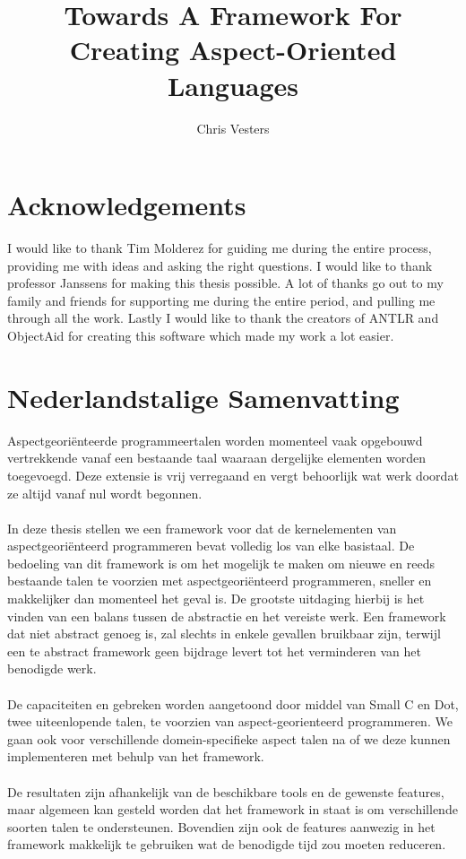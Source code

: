 \documentclass[a4paper]{report}
\title{Towards A Framework For Creating Aspect-Oriented Languages}
\author{Chris Vesters}
\begin{document}
\frontpages

\clearpage
{} 
{}
\chapter*{Acknowledgements}
I would like to thank Tim Molderez for guiding me during the entire process, providing me with ideas and asking the right questions. I would like to thank professor Janssens for making this thesis possible. A lot of thanks go out to my family and friends for supporting me during the entire period, and pulling me through all the work. Lastly I would like to thank the creators of ANTLR and ObjectAid for  creating this software which made my work a lot easier.

\clearpage 
{} 
{}
\chapter*{Nederlandstalige Samenvatting}
Aspectgeori\"{e}nteerde programmeertalen worden momenteel vaak opgebouwd vertrekkende vanaf een bestaande taal waaraan dergelijke elementen worden toegevoegd. Deze extensie is vrij verregaand en vergt behoorlijk wat werk doordat ze altijd vanaf nul wordt begonnen.\\
\\
In deze thesis stellen we een framework voor dat de kernelementen van aspectgeori\"{e}nteerd programmeren bevat volledig los van elke basistaal. De bedoeling van dit framework is om het mogelijk te maken om nieuwe en reeds bestaande talen te voorzien met aspectgeori\"{e}nteerd programmeren, sneller en makkelijker dan momenteel het geval is. De grootste uitdaging hierbij is het vinden van een balans tussen de abstractie en het vereiste werk. Een framework dat niet abstract genoeg is, zal slechts in enkele gevallen bruikbaar zijn, terwijl een te abstract framework geen bijdrage levert tot het verminderen van het benodigde werk.\\
\\
De capaciteiten en gebreken worden aangetoond door middel van Small C en Dot, twee uiteenlopende talen, te voorzien van aspect-georienteerd programmeren. We gaan ook voor verschillende domein-specifieke aspect talen na of we deze kunnen implementeren met behulp van het framework.\\
\\
De resultaten zijn afhankelijk van de beschikbare tools en de gewenste features, maar algemeen kan gesteld worden dat het framework in staat is om verschillende soorten talen te ondersteunen. Bovendien zijn ook de features aanwezig in het framework makkelijk te gebruiken wat de benodigde tijd zou moeten reduceren.
\end{document}
